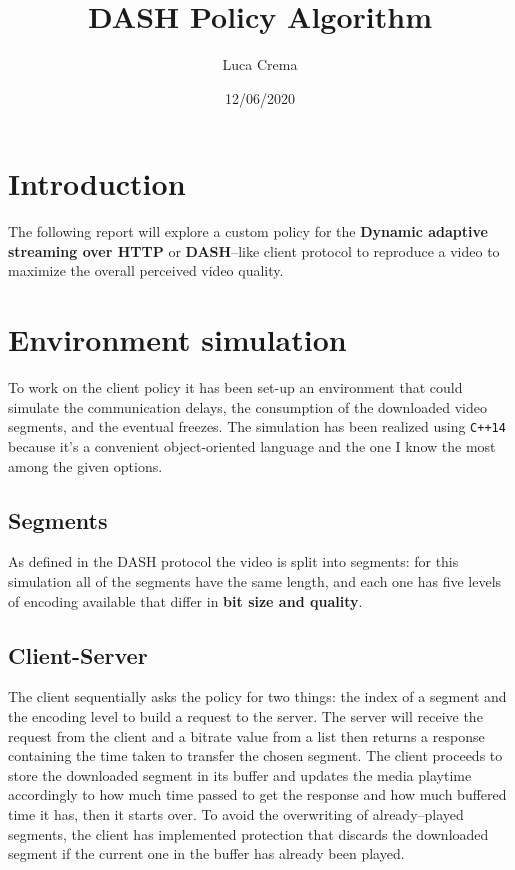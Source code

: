 \documentclass[10pt, a4paper]{article}
\title{DASH Policy Algorithm}
\author{Luca Crema}
\date{12/06/2020}
\begin{document}
    \maketitle
    \begin{multicols}{2}

    \section{Introduction}
    The following report will explore a custom policy
    for the \textbf{Dynamic adaptive streaming over HTTP}
    or \textbf{DASH}--like client protocol to reproduce a video
    to maximize the overall perceived video quality.

    \section{Environment simulation}
    To work on the client policy it has been set-up
    an environment that could simulate the communication 
    delays, the consumption of the downloaded video segments, and
    the eventual freezes.
    The simulation has been realized using \texttt{C++14} because
    it's a convenient object-oriented language and the one I know the
    most among the given options.

        \subsection{Segments}
        As defined in the DASH protocol the video is split into segments:
        for this simulation all of the segments have the same length,
        and each one has five levels of encoding available that differ
        in \textbf{bit size and quality}.

        \subsection{Client-Server}
        The client sequentially asks the policy for two things: the index of a
        segment and the encoding level to build a request to the server.
        The server will receive the request from the client and a bitrate value from
        a list then returns a response containing the time taken to transfer the
        chosen segment.
        \linebreak
        The client proceeds to store the downloaded segment in its buffer and
        updates the media playtime accordingly to how much time passed to get
        the response and how much buffered time it has, then it starts over.
        \linebreak
        To avoid the overwriting of already--played segments, the client has
        implemented protection that discards the downloaded segment if the current
        one in the buffer has already been played.


\end{multicols}
\end{document}
